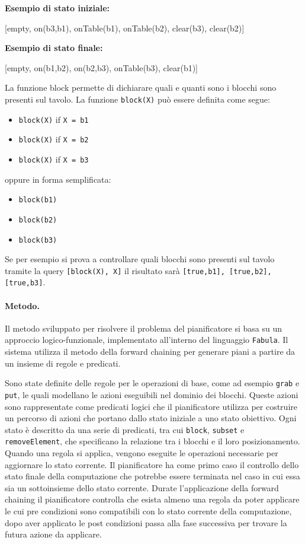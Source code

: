 \documentclass[12pt,twoside]{report}
\begin{document}
\textbf{Esempio di stato iniziale:}
\begin{center}
    [empty, on(b3,b1), onTable(b1), onTable(b2), clear(b3), clear(b2)]
\end{center}

\textbf{Esempio di stato finale:}
\begin{center}
    [empty, on(b1,b2), on(b2,b3), onTable(b3), clear(b1)]
\end{center}

La funzione block permette di dichiarare quali e quanti sono i blocchi sono presenti sul tavolo.
La funzione \texttt{block(X)} può essere definita come segue:
\begin{itemize}
    \item \texttt{block(X)} if \texttt{X = b1}
    \item \texttt{block(X)} if \texttt{X = b2}
    \item \texttt{block(X)} if \texttt{X = b3}
\end{itemize}
oppure in forma semplificata:
\begin{itemize}
    \item \texttt{block(b1)}
    \item \texttt{block(b2)}
    \item \texttt{block(b3)}
\end{itemize}

Se per esempio si prova a controllare quali blocchi sono presenti sul tavolo tramite la query \texttt{[block(X), X]} il risultato sarà \texttt{[true,b1], [true,b2], [true,b3]}.

\paragraph{Metodo.} Il metodo sviluppato per risolvere il problema del pianificatore si basa su un approccio logico-funzionale, implementato all'interno del linguaggio \texttt{Fabula}. Il sistema utilizza il metodo della forward chaining per generare piani a partire da un insieme di regole e predicati.

Sono state definite delle regole per le operazioni di base, come ad esempio \texttt{grab} e \texttt{put}, le quali modellano le azioni eseguibili nel dominio dei blocchi. Queste azioni sono rappresentate come predicati logici che il pianificatore utilizza per costruire un percorso di azioni che portano dallo stato iniziale a uno stato obiettivo.
Ogni stato è descritto da una serie di predicati, tra cui \texttt{block}, \texttt{subset} e \texttt{removeElement}, che specificano la relazione tra i blocchi e il loro posizionamento. Quando una regola si applica, vengono eseguite le operazioni necessarie per aggiornare lo stato corrente.
Il pianificatore ha come primo caso il controllo dello stato finale della computazione che potrebbe essere terminata nel caso in cui essa sia un sottoinsieme dello stato corrente.
Durate l'applicazione della forward chaining il pianificatore controlla che esista almeno una regola da poter applicare le cui pre condizioni sono compatibili con lo stato corrente della computazione, dopo aver applicato le post condizioni passa alla fase successiva per trovare la futura azione da applicare. 
\end{document}
